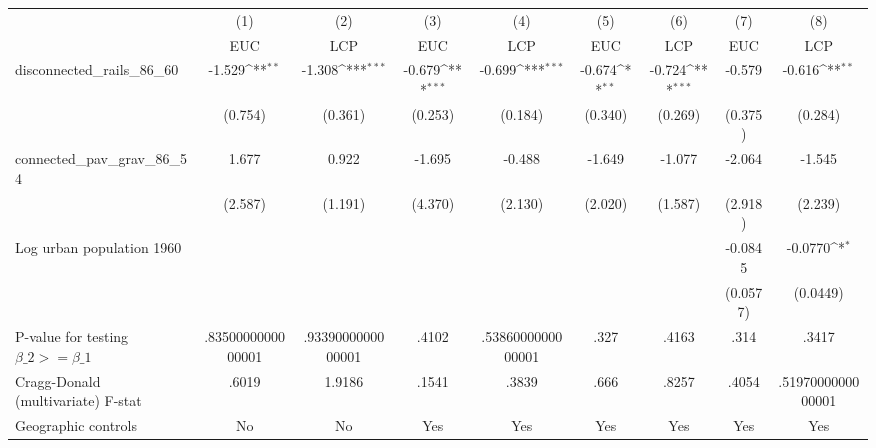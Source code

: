 {
\def\sym#1{\ifmmode^{#1}\else\(^{#1}\)\fi}
\begin{tabular}{l*{8}{c}}
\hline\hline
                &\multicolumn{1}{c}{(1)}&\multicolumn{1}{c}{(2)}&\multicolumn{1}{c}{(3)}&\multicolumn{1}{c}{(4)}&\multicolumn{1}{c}{(5)}&\multicolumn{1}{c}{(6)}&\multicolumn{1}{c}{(7)}&\multicolumn{1}{c}{(8)}\\
                &\multicolumn{1}{c}{EUC}&\multicolumn{1}{c}{LCP}&\multicolumn{1}{c}{EUC}&\multicolumn{1}{c}{LCP}&\multicolumn{1}{c}{EUC}&\multicolumn{1}{c}{LCP}&\multicolumn{1}{c}{EUC}&\multicolumn{1}{c}{LCP}\\
\hline
disconnected\_rails\_86\_60&   -1.529\sym{**} &   -1.308\sym{***}&   -0.679\sym{***}&   -0.699\sym{***}&   -0.674\sym{**} &   -0.724\sym{***}&   -0.579         &   -0.616\sym{**} \\
                &  (0.754)         &  (0.361)         &  (0.253)         &  (0.184)         &  (0.340)         &  (0.269)         &  (0.375)         &  (0.284)         \\
[1em]
connected\_pav\_grav\_86\_54&    1.677         &    0.922         &   -1.695         &   -0.488         &   -1.649         &   -1.077         &   -2.064         &   -1.545         \\
                &  (2.587)         &  (1.191)         &  (4.370)         &  (2.130)         &  (2.020)         &  (1.587)         &  (2.918)         &  (2.239)         \\
[1em]
Log urban population 1960&                  &                  &                  &                  &                  &                  &  -0.0845         &  -0.0770\sym{*}  \\
                &                  &                  &                  &                  &                  &                  & (0.0577)         & (0.0449)         \\
\hline
P-value for testing $\beta\_{2} >= \beta\_{1}$&.8350000000000001         &.9339000000000001         &    .4102         &.5386000000000001         &     .327         &    .4163         &     .314         &    .3417         \\
Cragg-Donald (multivariate) F-stat&    .6019         &   1.9186         &    .1541         &    .3839         &     .666         &    .8257         &    .4054         &.5197000000000001         \\
Geographic controls&       No         &       No         &      Yes         &      Yes         &      Yes         &      Yes         &      Yes         &      Yes         \\

\end{tabular}}
